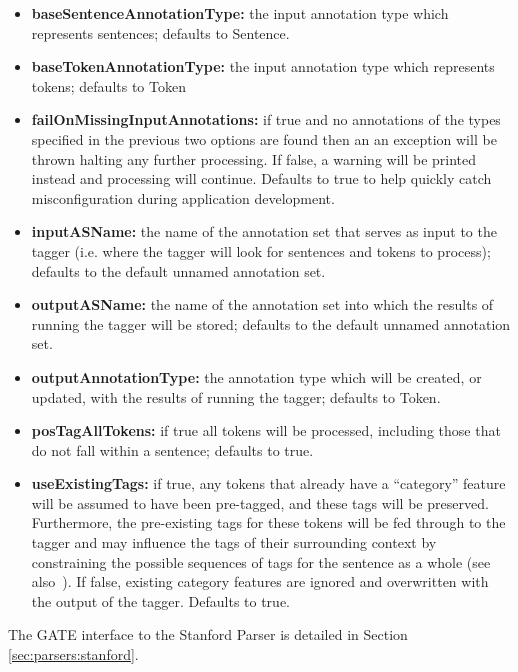 \begin{itemize}
\item \textbf{baseSentenceAnnotationType:} the input annotation type which
  represents sentences; defaults to Sentence.
\item \textbf{baseTokenAnnotationType:} the input annotation type which
  represents tokens; defaults to Token
\item \textbf{failOnMissingInputAnnotations:} if true and no annotations of
  the types specified in the previous two options are found then an an
  exception will be thrown halting any further processing. If false, a warning
  will be printed instead and processing will continue. Defaults to true to help
  quickly catch misconfiguration during application development.
\item \textbf{inputASName:} the name of the annotation set that serves as input
  to the tagger (i.e. where the tagger will look for sentences and tokens to
  process); defaults to the default unnamed annotation set.
\item \textbf{outputASName:} the name of the annotation set into which the
  results of running the tagger will be stored; defaults to the default unnamed
  annotation set.
\item \textbf{outputAnnotationType:} the annotation type which will be created,
  or updated, with the results of running the tagger; defaults to Token.
\item \textbf{posTagAllTokens:} if true all tokens will be processed, including
  those that do not fall within a sentence; defaults to true.
\item \textbf{useExistingTags:} if true, any tokens that already have a
  ``category'' feature will be assumed to have been pre-tagged, and these tags
  will be preserved.  Furthermore, the pre-existing tags for these tokens will
  be fed through to the tagger and may influence the tags of their
  surrounding context by constraining the possible sequences of tags for the
  sentence as a whole (see also~\cite{Derczynski2013c}).  If false, existing
  category features are ignored and overwritten with the output of the tagger.
  Defaults to true.
\end{itemize}


The GATE interface to the Stanford Parser is detailed in Section \ref{sec:parsers:stanford}.


